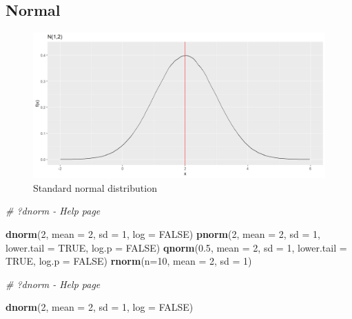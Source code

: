 \documentclass[
]{book}
\newenvironment{Shaded}{\begin{snugshade}}{\end{snugshade}}
\newcommand{\AttributeTok}[1]{\textcolor[rgb]{0.13,0.29,0.53}{#1}}
\newcommand{\CommentTok}[1]{\textcolor[rgb]{0.56,0.35,0.01}{\textit{#1}}}
\newcommand{\ConstantTok}[1]{\textcolor[rgb]{0.56,0.35,0.01}{#1}}
\newcommand{\DecValTok}[1]{\textcolor[rgb]{0.00,0.00,0.81}{#1}}
\newcommand{\FloatTok}[1]{\textcolor[rgb]{0.00,0.00,0.81}{#1}}
\newcommand{\FunctionTok}[1]{\textcolor[rgb]{0.13,0.29,0.53}{\textbf{#1}}}
\newcommand{\NormalTok}[1]{#1}
\begin{document}
\hypertarget{normal}{%
\subsection{Normal}\label{normal}}

\begin{figure}

{\centering \includegraphics{figure/norm6-1} 

}

\caption{Standard normal distribution}\label{fig:norm6}
\end{figure}

\begin{Shaded}
\begin{Highlighting}[]
\CommentTok{\# ?dnorm {-} Help page}

\FunctionTok{dnorm}\NormalTok{(}\DecValTok{2}\NormalTok{, }\AttributeTok{mean =} \DecValTok{2}\NormalTok{, }\AttributeTok{sd =} \DecValTok{1}\NormalTok{, }\AttributeTok{log =} \ConstantTok{FALSE}\NormalTok{)}
\FunctionTok{pnorm}\NormalTok{(}\DecValTok{2}\NormalTok{, }\AttributeTok{mean =} \DecValTok{2}\NormalTok{, }\AttributeTok{sd =} \DecValTok{1}\NormalTok{, }\AttributeTok{lower.tail =} \ConstantTok{TRUE}\NormalTok{, }\AttributeTok{log.p =} \ConstantTok{FALSE}\NormalTok{)}
\FunctionTok{qnorm}\NormalTok{(}\FloatTok{0.5}\NormalTok{, }\AttributeTok{mean =} \DecValTok{2}\NormalTok{, }\AttributeTok{sd =} \DecValTok{1}\NormalTok{, }\AttributeTok{lower.tail =} \ConstantTok{TRUE}\NormalTok{, }\AttributeTok{log.p =} \ConstantTok{FALSE}\NormalTok{)}
\FunctionTok{rnorm}\NormalTok{(}\AttributeTok{n=}\DecValTok{10}\NormalTok{, }\AttributeTok{mean =} \DecValTok{2}\NormalTok{, }\AttributeTok{sd =} \DecValTok{1}\NormalTok{)}
\end{Highlighting}
\end{Shaded}

\begin{Shaded}
\begin{Highlighting}[]
\CommentTok{\# ?dnorm {-} Help page}

\FunctionTok{dnorm}\NormalTok{(}\DecValTok{2}\NormalTok{, }\AttributeTok{mean =} \DecValTok{2}\NormalTok{, }\AttributeTok{sd =} \DecValTok{1}\NormalTok{, }\AttributeTok{log =} \ConstantTok{FALSE}\NormalTok{)}
\end{Highlighting}
\end{Shaded}
\end{document}
